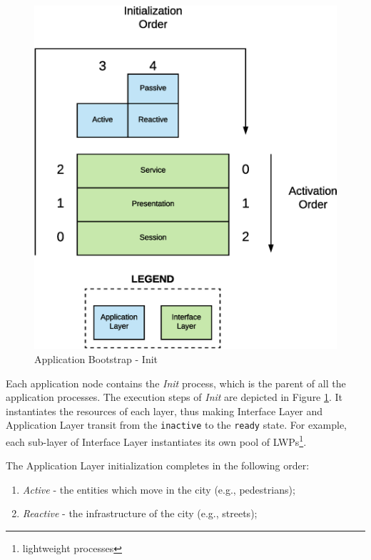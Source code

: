 \begin{figure}[H]
  \centering
  \includegraphics[scale=0.5,keepaspectratio]
    {images/solution/init_activate.eps}
  \caption{Application Bootstrap - Init}
  \label{fig:sd-app-init}
\end{figure}



Each application node contains the \textit{Init} process,
which is the parent of all the application processes.
The execution steps of \textit{Init} are depicted in Figure
\ref{fig:sd-app-init}.
It instantiates the resources of each layer, thus making
Interface Layer and Application Layer transit from the \verb|inactive|
to the \verb|ready| state.
For example, each sub-layer of Interface Layer instantiates its own pool of
LWPs\footnote{lightweight processes}.

The Application Layer initialization completes in the following order:

\begin{enumerate}
  \item \textit{Active} - the entities which move in the city (e.g.,
    pedestrians);
  \item \textit{Reactive} - the infrastructure of the city (e.g., streets);
\end{enumerate}

